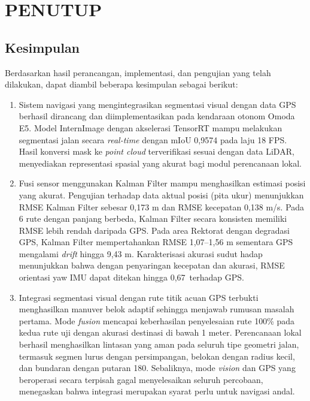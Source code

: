\chapter{PENUTUP}
\label{chap:penutup}

\section{Kesimpulan}
\label{sec:kesimpulan}

Berdasarkan hasil perancangan, implementasi, dan pengujian yang telah dilakukan, dapat diambil beberapa kesimpulan sebagai berikut:

\begin{enumerate}
    \item Sistem navigasi yang mengintegrasikan segmentasi visual dengan data GPS berhasil dirancang dan diimplementasikan pada kendaraan otonom Omoda E5.
    Model InternImage dengan akselerasi TensorRT mampu melakukan segmentasi jalan secara \emph{real-time} dengan mIoU 0,9574 pada laju 18 FPS.
    Hasil konversi mask ke \emph{point cloud} terverifikasi sesuai dengan data LiDAR, menyediakan representasi spasial yang akurat bagi modul perencanaan lokal.

    \item Fusi sensor menggunakan Kalman Filter mampu menghasilkan estimasi posisi yang akurat.
    Pengujian terhadap data aktual posisi (pita ukur) menunjukkan RMSE Kalman Filter sebesar 0,173 m dan RMSE kecepatan 0,138 m/s.
    Pada 6 rute dengan panjang berbeda, Kalman Filter secara konsisten memiliki RMSE lebih rendah daripada GPS.
    Pada area Rektorat dengan degradasi GPS, Kalman Filter mempertahankan RMSE 1,07--1,56 m sementara GPS mengalami \emph{drift} hingga 9,43 m.
    Karakterisasi akurasi sudut hadap menunjukkan bahwa dengan penyaringan kecepatan dan akurasi, RMSE orientasi yaw IMU dapat ditekan hingga 0,67\textdegree\ terhadap GPS.

    \item Integrasi segmentasi visual dengan rute titik acuan GPS terbukti menghasilkan manuver belok adaptif sehingga menjawab rumusan masalah pertama.
    Mode \emph{fusion} mencapai keberhasilan penyelesaian rute 100\% pada kedua rute uji dengan akurasi destinasi di bawah 1 meter.
    Perencanaan lokal berhasil menghasilkan lintasan yang aman pada seluruh tipe geometri jalan, termasuk segmen lurus dengan persimpangan, belokan dengan radius kecil, dan bundaran dengan putaran 180\textdegree.
    Sebaliknya, mode \emph{vision} dan GPS yang beroperasi secara terpisah gagal menyelesaikan seluruh percobaan, menegaskan bahwa integrasi merupakan syarat perlu untuk navigasi andal.


\end{enumerate}
